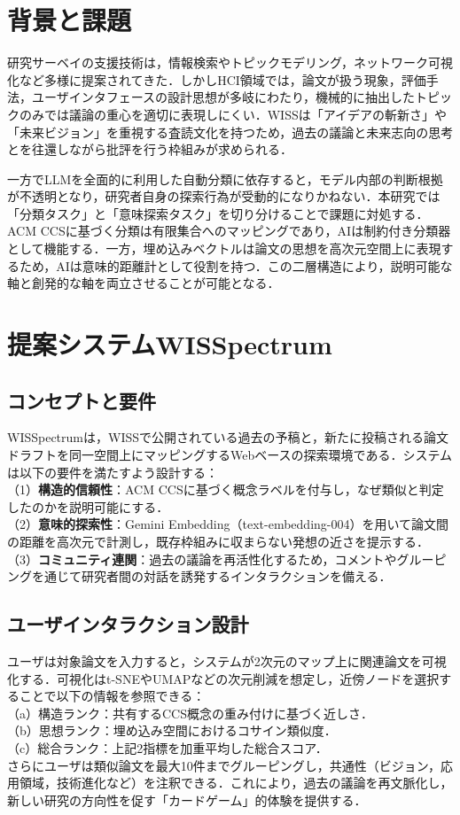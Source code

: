 \documentclass[twoside]{wiss}
\begin{document}
\section{背景と課題}
研究サーベイの支援技術は，情報検索やトピックモデリング，ネットワーク可視化など多様に提案されてきた．しかしHCI領域では，論文が扱う現象，評価手法，ユーザインタフェースの設計思想が多岐にわたり，機械的に抽出したトピックのみでは議論の重心を適切に表現しにくい．WISSは「アイデアの斬新さ」や「未来ビジョン」を重視する査読文化を持つため，過去の議論と未来志向の思考とを往還しながら批評を行う枠組みが求められる．

一方でLLMを全面的に利用した自動分類に依存すると，モデル内部の判断根拠が不透明となり，研究者自身の探索行為が受動的になりかねない．本研究では「分類タスク」と「意味探索タスク」を切り分けることで課題に対処する．ACM CCSに基づく分類は有限集合へのマッピングであり，AIは制約付き分類器として機能する．一方，埋め込みベクトルは論文の思想を高次元空間上に表現するため，AIは意味的距離計として役割を持つ．この二層構造により，説明可能な軸と創発的な軸を両立させることが可能となる．

\section{提案システムWISSpectrum}

\subsection{コンセプトと要件}
WISSpectrumは，WISSで公開されている過去の予稿と，新たに投稿される論文ドラフトを同一空間上にマッピングするWebベースの探索環境である．システムは以下の要件を満たすよう設計する：\\
（1）\textbf{構造的信頼性}：ACM CCSに基づく概念ラベルを付与し，なぜ類似と判定したのかを説明可能にする．\\
（2）\textbf{意味的探索性}：Gemini Embedding（text-embedding-004）を用いて論文間の距離を高次元で計測し，既存枠組みに収まらない発想の近さを提示する．\\
（3）\textbf{コミュニティ連関}：過去の議論を再活性化するため，コメントやグルーピングを通じて研究者間の対話を誘発するインタラクションを備える．

\subsection{ユーザインタラクション設計}
ユーザは対象論文を入力すると，システムが2次元のマップ上に関連論文を可視化する．可視化はt-SNEやUMAPなどの次元削減を想定し，近傍ノードを選択することで以下の情報を参照できる：\\
（a）構造ランク：共有するCCS概念の重み付けに基づく近しさ．\\
（b）思想ランク：埋め込み空間におけるコサイン類似度．\\
（c）総合ランク：上記2指標を加重平均した総合スコア．\\
さらにユーザは類似論文を最大10件までグルーピングし，共通性（ビジョン，応用領域，技術進化など）を注釈できる．これにより，過去の議論を再文脈化し，新しい研究の方向性を促す「カードゲーム」的体験を提供する．
\end{document}
